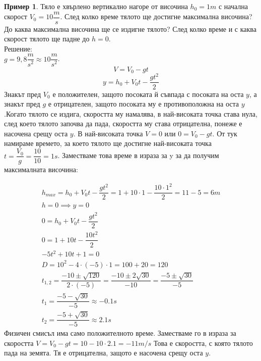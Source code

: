 \documentclass[fleqn, 12pt]{article}
\theoremstyle{definition}
\newtheorem{example}{Пример}[subsection]
\begin{document}
\begin{example}
Тяло е хвърлено вертикално нагоре от височина $h_0 = 1m$ с начална скорост $V_0 = 10 \dfrac{m}{s}$. След колко време тялото ще достигне максимална височина? До каква максимална височина ще се издигне тялото? След колко време и с каква скорост тялото ще падне до $h = 0$. \\
Решение: \\
$g = 9,8 \dfrac{m}{s^2} \approx 10 \dfrac{m}{s^2}$. \\
$$V = V_0 - gt$$
$$y = h_0 + V_0t - \dfrac{gt^2}{2}$$
Знакът пред $V_0$ е положителен, защото посоката й съвпада с посоката на оста $y$, а знакът пред $g$ е отрицателен, защото посоката му е противоположна на оста $y$.Когато тялото се издига, скоростта му намалява, в най-високата точка става нула, след което тялото започва да пада, скоростта му става отрицателна, понеже е насочена срещу оста $y$. В най-високата точка $V = 0$  или $0 = V_0 - gt$. От тук намираме времето, за което тялото ще достигне най-високата точка $t = \dfrac{V_0}{g} = \dfrac{10}{10} = 1s$. Заместваме това време в израза за y за да получим максималната височина:

\begin{gather*}
h_{max} = h_0 + V_0t -  \dfrac{gt^2}{2} = 1+ 10 \cdot 1 -  \dfrac{10 \cdot 1^2}{2} = 11 - 5 = 6m\\
h = 0  \implies y = 0\\
0 = h_0 + V_0t - \dfrac{gt^2}{2} \\
0 = 1 + 10t -  \dfrac{10t^2}{2}\\
-5t^2 + 10t  + 1 = 0 \\
D = 10^2 - 4 \cdot (-5) \cdot 1 = 100 + 20 = 120 \\
t_{1,2} = \dfrac{-10 \pm \sqrt{120}}{2 \cdot (-5)} = \dfrac{-10 \pm 2\sqrt{30}}{-10} = \dfrac{-5 \pm \sqrt{30}}{-5}\\
t_1 = \dfrac{-5 -\sqrt{30}}{-5} \approx -0.1 s\\
t_2 = \dfrac{-5 +\sqrt{30}}{-5} \approx 2.1 s
\end{gather*}
Физичен смисъл има само положителното време. Заместваме го в израза за скоростта $V = V_0 - gt = 10 - 10 \cdot 2.1 = -11 m/s$ Това е скоростта, с която тялото пада на земята. Тя е отрицателна, защото е насочена срещу оста $y$.
\end{example}
\end{document}
